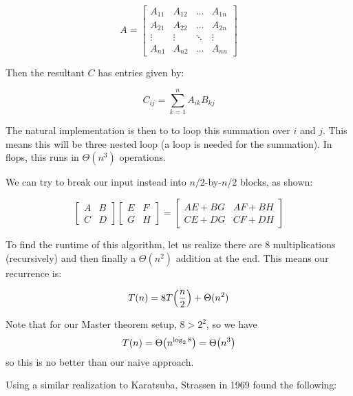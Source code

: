 \[ A = \begin{bmatrix}
    A_{11}& A_{12}& \ldots& A_{1n} \\
    A_{21}& A_{22} & \ldots & A_{2n} \\
    \vdots& \vdots & \ddots & \vdots \\
    A_{n1} & A_{n2} & \ldots & A_{nn}
\end{bmatrix} \]

Then the resultant $C$ has entries given by:

\[ C_{ij} = \sum_{k = 1}^n A_{ik} B_{kj} \]

The natural implementation is then to to loop this summation over $i$
and $j$. This means this will be three nested loop (a loop is needed for the summation).
In flops, this runs in $\Theta(n^3)$ operations.

We can try to break our input instead into $n / 2$-by-$n / 2$ blocks, as shown:

\[ \begin{bmatrix}
    A & B \\
    C & D
\end{bmatrix} \begin{bmatrix}
    E & F \\
    G & H
\end{bmatrix} = \begin{bmatrix}
    AE + BG & AF + BH \\
    CE + DG & CF + DH
\end{bmatrix} \]

To find the runtime of this algorithm, let us realize there are
8 multiplications (recursively) and then finally a $\Theta(n^2)$ addition at the end.
This means our recurrence is:

\[ T(n) = 8 T\qty(\frac{n}{2}) + \Theta(n^2) \]

Note that for our Master theorem setup, $8 > 2^2$, so we have
\[ T(n) = \Theta\qty(n^{\log_2{8}}) = \Theta\qty(n^3) \]
so this is no better than our naive approach.

Using a similar realization to Karatsuba, Strassen in 1969 found the following:

